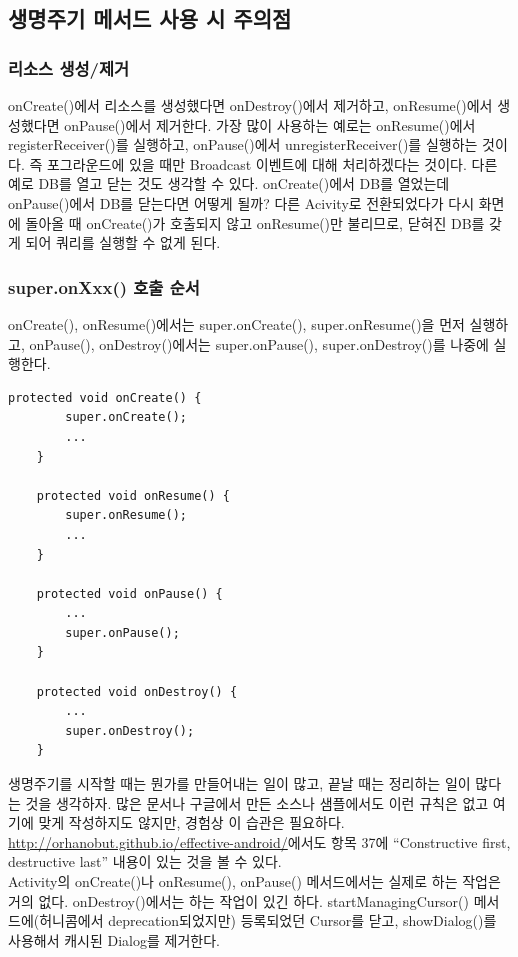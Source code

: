 \subsection{생명주기 메서드 사용 시 주의점}
\subsubsection{리소스 생성/제거}
onCreate()에서 리소스를 생성했다면 onDestroy()에서 제거하고, onResume()에서 생성했다면 onPause()에서 제거한다.
가장 많이 사용하는 예로는 onResume()에서 registerReceiver()를 실행하고, onPause()에서 unregisterReceiver()를 실행하는 것이다. 즉 포그라운드에 있을 때만 Broadcast 이벤트에 대해 처리하겠다는 것이다. 다른 예로 DB를 열고 닫는 것도 생각할 수 있다.
onCreate()에서 DB를 열었는데 onPause()에서 DB를 닫는다면 어떻게 될까?
다른 Acivity로 전환되었다가 다시 화면에 돌아올 때 onCreate()가 호출되지 않고 onResume()만 불리므로, 닫혀진 DB를 갖게 되어 쿼리를 실행할 수 없게 된다.

\subsubsection{super.onXxx() 호출 순서}
onCreate(), onResume()에서는 super.onCreate(), super.onResume()을 먼저 실행하고, 
onPause(), onDestroy()에서는 super.onPause(), super.onDestroy()를 나중에 실행한다.\\

\begin{lstlisting}[frame=single]
	protected void onCreate() {
    	super.onCreate();
    	...
	}

	protected void onResume() {
    	super.onResume();
    	...
	}

	protected void onPause() {
		...
		super.onPause();
	}

	protected void onDestroy() {
    	...
		super.onDestroy();
	}
\end{lstlisting}
생명주기를 시작할 때는 뭔가를 만들어내는 일이 많고, 끝날 때는 정리하는 일이 많다는 것을 생각하자.
많은 문서나 구글에서 만든 소스나 샘플에서도 이런 규칙은 없고 여기에 맞게 작성하지도 않지만, 경험상 이 습관은 필요하다. \url{http://orhanobut.github.io/effective-android/}에서도 항목 37에 ``Constructive first, destructive last'' 내용이 있는 것을 볼 수 있다.\\

Activity의 onCreate()나 onResume(), onPause() 메서드에서는 실제로 하는 작업은 거의 없다.
onDestroy()에서는 하는 작업이 있긴 하다. 
startManagingCursor() 메서드에(허니콤에서 deprecation되었지만) 등록되었던 Cursor를 닫고,
showDialog()를 사용해서 캐시된 Dialog를 제거한다.\\

